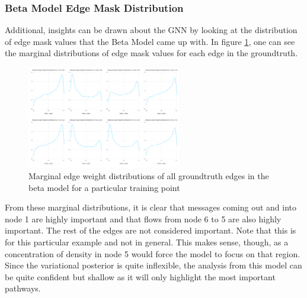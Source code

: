 \subsubsection{Beta Model Edge Mask Distribution}
Additional, insights can be drawn about the GNN by looking at the distribution of edge mask values that the Beta Model came up with. In figure \ref{fig:tree-model-beta-marginal}, one can see the marginal distributions of edge mask values for each edge in the groundtruth. 
\begin{figure}[htb]
	\centering
	\includegraphics[width=0.6\textwidth]{images/tree-model-beta-marginal.pdf}
	\caption{Marginal edge weight distributions of all groundtruth edges in the beta model for a particular training point}
	\label{fig:tree-model-beta-marginal}
\end{figure}
From these marginal distributions, it is clear that messages coming out and into node 1 are highly important and that flows from node 6 to 5 are also highly important. The rest of the edges are not considered important. Note that this is for this particular example and not in general. This makes sense, though, as a concentration of density in node 5 would force the model to focus on that region. Since the variational posterior is quite inflexible, the analysis from this model can be quite confident but shallow as it will only highlight the most important pathways.

